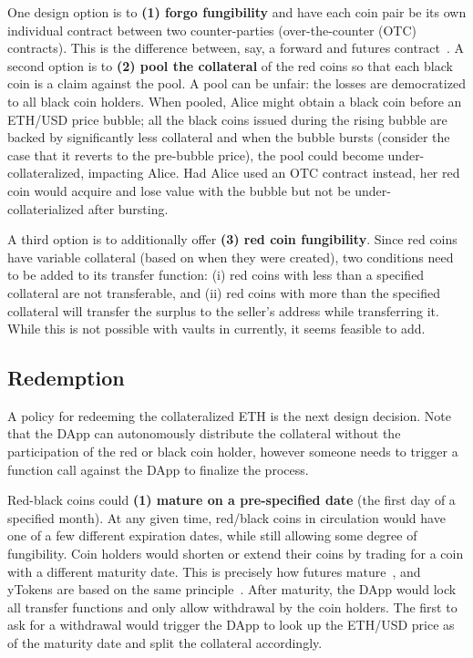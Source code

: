One design option is to \textbf{(1) forgo fungibility} and have each coin pair be its own individual contract between two counter-parties (\aka over-the-counter (OTC) contracts). This is the difference between, say, a forward and futures contract~\cite{Har03}. A second option is to \textbf{(2) pool the collateral} of the red coins so that each black coin is a claim against the pool. A pool can be unfair: the losses are democratized to all black coin holders. When pooled, Alice might obtain a black coin before an ETH/USD price bubble; all the black coins issued during the rising bubble are backed by significantly less collateral and when the bubble bursts (consider the case that it reverts to the pre-bubble price), the pool could become under-collateralized, impacting Alice. Had Alice used an OTC contract instead, her red coin would acquire and lose value with the bubble but not be under-collaterialized after bursting. 

A third option is to additionally offer \textbf{(3) red coin fungibility}. Since red coins have variable collateral (based on when they were created), two conditions need to be added to its transfer function: (i) red coins with less than a specified collateral are not transferable, and (ii) red coins with more than the specified collateral will transfer the surplus to the seller’s address while transferring it. While this is not possible with vaults in \dai currently, it seems feasible to add.
	

\subsection{Redemption}
\label{sec:maturity}

A policy for redeeming the collateralized ETH is the next design decision. Note that the DApp can autonomously distribute the collateral without the participation of the red or black coin holder, however someone needs to trigger a function call against the DApp to finalize the process.

 Red-black coins could \textbf{(1) mature on a pre-specified date} (\eg the first day of a specified month). At any given time, red/black coins in circulation would have one of a few different expiration dates, while still allowing some degree of fungibility. Coin holders would shorten or extend their coins by trading for a coin with a different maturity date. This is precisely how futures  mature~\cite{Har03}, and yTokens are based on the same principle~\cite{RoNi20}. After maturity, the DApp would lock all transfer functions and only allow withdrawal by the coin holders. The first to ask for a withdrawal would trigger the DApp to look up the ETH/USD price as of the maturity date and split the collateral accordingly. 

